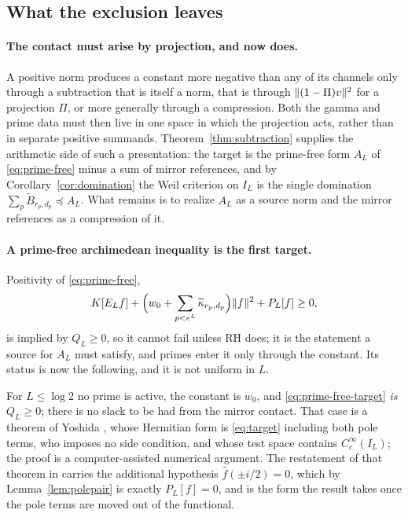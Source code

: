 \subsection{What the exclusion leaves}\label{subsec:leaves}
\paragraph{The contact must arise by projection, and now does.}
A positive norm produces a constant more negative than any of its channels
only through a subtraction that is itself a norm, that is through
$\lVert (1-\Pi)v\rVert^2$ for a projection $\Pi$, or more generally through a
compression. Both the gamma and prime data must then live in one space in
which the projection acts, rather than in separate positive summands.
Theorem~\ref{thm:subtraction} supplies the arithmetic side of such a
presentation: the target is the prime-free form $A_L$ of
\eqref{eq:prime-free} minus a sum of mirror references, and by
Corollary~\ref{cor:domination} the Weil criterion on $I_L$ is the single
domination $\sum_p\widetilde B_{r_p,d_p}\preceq A_L$. What remains is to
realize $A_L$ as a source norm and the mirror references as a compression of
it.

\paragraph{A prime-free archimedean inequality is the first target.}
Positivity of \eqref{eq:prime-free},
\begin{equation}\label{eq:prime-free-target}
 K[E_Lf]+\Big(w_0+\sum_{p<e^L}\widetilde\kappa_{r_p,d_p}\Big)\lVert f\rVert^2
 +P_L[f]\geq0,
\end{equation}
is implied by $Q_L\geq0$, so it cannot fail unless RH does; it is the
statement a source for $A_L$ must satisfy, and primes enter it only through
the constant. Its status is now the following, and it is not uniform in $L$.

For $L\leq\log2$ no prime is active, the constant is $w_0$, and
\eqref{eq:prime-free-target} \emph{is} $Q_L\geq0$; there is no slack to be had
from the mirror contact. That case is a theorem of Yoshida
\cite[Theorem 1]{Yoshida}, whose Hermitian form is \eqref{eq:target} including
both pole terms, who imposes no side condition, and whose test space contains
$C_c^\infty(I_L)$; the proof is a computer-assisted numerical argument. The
restatement of that theorem in \cite{CCWeil} carries the additional hypothesis
$\widehat f(\pm i/2)=0$, which by Lemma~\ref{lem:polepair} is exactly
$P_L[f]=0$, and is the form the result takes once the pole terms are moved out
of the functional.

